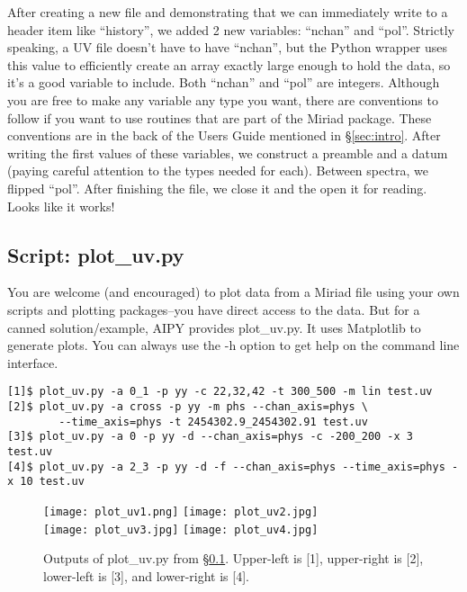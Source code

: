 After creating a new file and demonstrating that we can immediately write to a
header item like ``history'', we added 2 new variables: ``nchan'' and ``pol''.
Strictly speaking, a UV file doesn't have to have ``nchan'', but the Python
wrapper uses this value to efficiently create an array exactly large enough to
hold the data, so it's a good variable to include.  Both ``nchan'' and ``pol''
are integers.  Although you are free to make any variable any type you want, 
there are
conventions to follow if you want to use routines that are part of the Miriad
package.  These conventions are in the back of the Users Guide mentioned in
\S\ref{sec:intro}.  After writing the first values of these variables, we
construct a preamble and a datum (paying careful attention to the types needed
for each).  Between spectra, we flipped ``pol''.  After finishing the file,
we close it and the open it for reading.  Looks like it works!

\subsection{Script: plot\_uv.py}
\label{sec:plot_uv}

You are welcome (and encouraged) to plot data from a Miriad file using your
own scripts and plotting packages--you have direct access to the data.  But
for a canned solution/example, AIPY provides plot\_uv.py.  It uses 
Matplotlib to generate plots.  You can always use the -h option to get
help on the command line interface.

\begin{verbatim}
[1]$ plot_uv.py -a 0_1 -p yy -c 22,32,42 -t 300_500 -m lin test.uv
[2]$ plot_uv.py -a cross -p yy -m phs --chan_axis=phys \
        --time_axis=phys -t 2454302.9_2454302.91 test.uv
[3]$ plot_uv.py -a 0 -p yy -d --chan_axis=phys -c -200_200 -x 3 test.uv
[4]$ plot_uv.py -a 2_3 -p yy -d -f --chan_axis=phys --time_axis=phys -x 10 test.uv
\end{verbatim}

\begin{figure}
\begin{center}
\texttt{[image: plot\_uv1.png]}
\texttt{[image: plot\_uv2.jpg]}\\
\texttt{[image: plot\_uv3.jpg]}
\texttt{[image: plot\_uv4.jpg]}\\
\caption{Outputs of plot\_uv.py from \S\ref{sec:plot_uv}. Upper-left is [1],
upper-right is [2], lower-left is [3], and lower-right is [4].}
\label{fig:plot_uv}
\end{center}
\end{figure}

